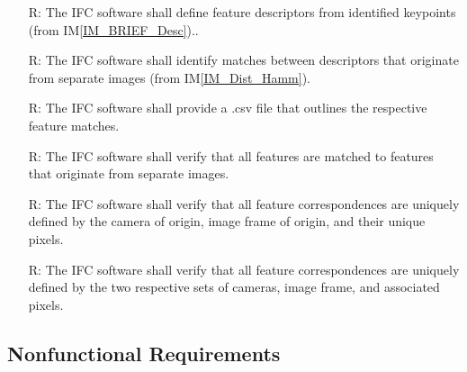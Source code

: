 \documentclass[12pt]{article}
\newcommand{\iref}[1]{IM\ref{#1}}
\newcounter{reqnum} %
\begin{document}
\begin{itemize}
\item[R\refstepcounter{reqnum}\thereqnum \label{R_DefineDescriptors}:] The IFC software shall 
define feature descriptors from identified keypoints (from \iref{IM_BRIEF_Desc})..

\item[R\refstepcounter{reqnum}\thereqnum \label{R_CompareDescriptors}:] The IFC software shall 
identify matches between descriptors that originate from separate images (from \iref{IM_Dist_Hamm}).

\item[R\refstepcounter{reqnum}\thereqnum \label{R_OutputCorrespondences}:] The IFC software shall 
provide a .csv file that outlines the respective feature matches.

\item[R\refstepcounter{reqnum}\thereqnum \label{R_DistinctImages}:] The IFC software shall verify 
that all features are matched to features that originate from separate images.

\item[R\refstepcounter{reqnum}\thereqnum \label{R_UniqueKeypoint_IDs}:] The IFC software shall verify 
that all feature correspondences are uniquely defined by the camera of origin, image frame of origin, 
and their unique pixels.

\item[R\refstepcounter{reqnum}\thereqnum \label{R_UniqueMatch_IDs}:] The IFC software shall verify 
that all feature correspondences are uniquely defined by the two respective sets of cameras, image frame, 
and associated pixels.

\end{itemize}


\subsection{Nonfunctional Requirements}
\end{document}
